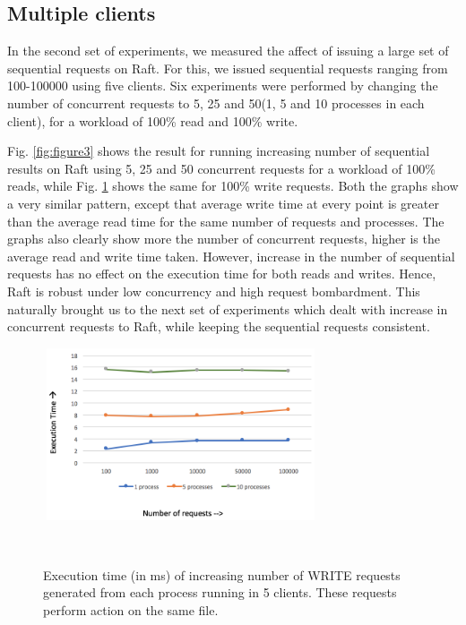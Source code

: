 \subsection{Multiple clients}

In the second set of experiments, we measured the affect of issuing a large set of sequential requests on Raft. For this, we issued sequential requests ranging from 100-100000 using five clients. Six experiments were performed by changing the number of concurrent requests to 5, 25 and 50(1, 5 and 10 processes in each client), for a workload of 100\% read and 100\% write.

Fig. \ref{fig:figure3} shows the result for running increasing number of sequential results on Raft using 5, 25 and 50 concurrent requests for a workload of 100\% reads, while Fig. \ref{fig:figure4} shows the same for 100\% write requests. Both the graphs show a very similar pattern, except that average write time at every point is greater than the average read time for the same number of requests and processes. The graphs also clearly show more the number of concurrent requests, higher is the average read and write time taken. However, increase in the number of sequential requests has no effect on the execution time for both reads and writes. Hence, Raft is robust under low concurrency and high request bombardment.
This naturally brought us to the next set of experiments which dealt with increase in concurrent requests to Raft, while keeping the sequential requests consistent.

\begin{figure}
\centering
\includegraphics[height=2in, width=3.2in]{images/F-HC-SF-W.png}
\caption{Execution time (in ms) of increasing number of WRITE requests generated from each process running in 5 clients. These requests perform action on the same file.}~\label{fig:figure4}
\end{figure}

